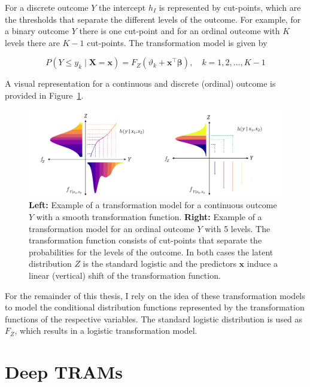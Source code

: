 For a discrete outcome $Y$ the intercept $h_I$ is represented by cut-points, which are the thresholds that separate the different levels of the outcome. For example, for a binary outcome $Y$ there is one cut-point and for an ordinal outcome with $K$ levels there are $K-1$ cut-points. The transformation model is given by

\begin{equation}
P(Y \leq y_k \mid \mathbf{X} = \mathbf{x}) = F_Z(\vartheta_k + \mathbf{x}^\top \boldsymbol{\beta}), \quad k = 1, 2, \ldots, K - 1
\end{equation}


A visual representation for a continuous and discrete (ordinal) outcome is provided in Figure~\ref{fig:tram_cont_ord}.


\begin{figure}[H]
\centering
\includegraphics[width=1\textwidth]{img/tram_cont_ord.png}
\caption{\textbf{Left:} Example of a transformation model for a continuous outcome $Y$ with a smooth transformation function. \textbf{Right:} Example of a transformation model for an ordinal outcome $Y$ with 5 levels. The transformation function consists of cut-points that separate the probabilities for the levels of the outcome.
In both cases the latent distribution $Z$ is the standard logistic and the predictors $\mathbf{x}$ induce a linear (vertical) shift of the transformation function.}
\label{fig:tram_cont_ord}
\end{figure}


For the remainder of this thesis, I rely on the idea of these transformation models to model the conditional distribution functions represented by the transformation functions of the respective variables. The standard logistic distribution is used as $F_Z$, which results in a logistic transformation model.


\section{Deep TRAMs}

